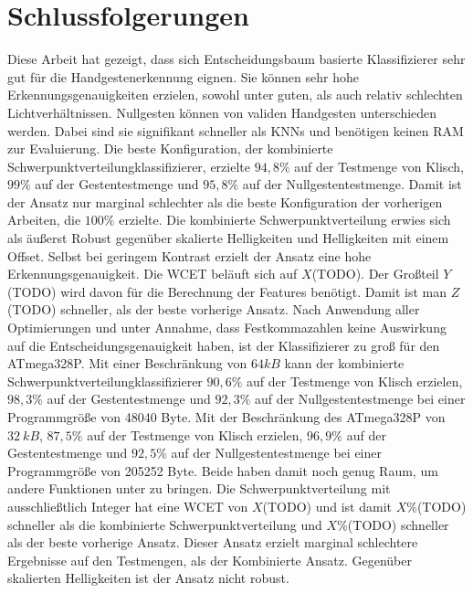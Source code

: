 \chapter{Schlussfolgerungen}
Diese Arbeit hat gezeigt, dass sich Entscheidungsbaum basierte Klassifizierer sehr gut für die Handgestenerkennung eignen. Sie können sehr hohe Erkennungsgenauigkeiten erzielen, sowohl unter guten, als auch
relativ schlechten Lichtverhältnissen. Nullgesten können von validen Handgesten unterschieden werden. Dabei sind sie signifikant schneller als KNNs und benötigen keinen RAM zur Evaluierung.
\newline
\newline
Die beste Konfiguration, der kombinierte Schwerpunktverteilungklassifizierer, erzielte $94,8\%$ auf der Testmenge von Klisch, $99\%$ auf der Gestentestmenge und $95,8\%$ auf der Nullgestentestmenge. Damit
ist der Ansatz nur marginal schlechter als die beste Konfiguration der vorherigen Arbeiten, die $100\%$ erzielte. Die kombinierte Schwerpunktverteilung erwies sich als äußerst Robust gegenüber skalierte
Helligkeiten und Helligkeiten mit einem Offset. Selbst bei geringem Kontrast erzielt der Ansatz eine hohe Erkennungsgenauigkeit. Die WCET beläuft sich auf $X$(TODO). Der Großteil $Y$(TODO) wird davon für
die Berechnung der Features benötigt. Damit ist man $Z$(TODO) schneller, als der beste vorherige Ansatz. Nach Anwendung aller Optimierungen und unter Annahme, dass Festkommazahlen keine Auswirkung auf
die Entscheidungsgenauigkeit haben, ist der Klassifizierer zu groß für den ATmega328P.
\newline
\newline
Mit einer Beschränkung von $64 kB$ kann der kombinierte Schwerpunktverteilungklassifizierer $90,6\%$ auf der Testmenge von Klisch erzielen, $98,3\%$ auf
der Gestentestmenge und $92,3\%$ auf der Nullgestentestmenge bei einer Programmgröße von 48040 Byte. Mit der Beschränkung des ATmega328P von $32\ kB$, $87,5\%$ auf der
Testmenge von Klisch erzielen, $96,9\%$ auf der Gestentestmenge und $92,5\%$ auf der Nullgestentestmenge bei einer Programmgröße von 205252 Byte.
Beide haben damit noch genug Raum, um andere Funktionen unter zu bringen.
\newline
\newline
Die Schwerpunktverteilung mit ausschließtlich Integer hat eine WCET von $X$(TODO) und ist damit $X\%$(TODO) schneller als die kombinierte Schwerpunktverteilung und $X\%$(TODO) schneller als der beste vorherige
Ansatz. Dieser Ansatz erzielt marginal schlechtere Ergebnisse auf den Testmengen, als der Kombinierte Ansatz. Gegenüber skalierten Helligkeiten ist der Ansatz nicht robust.
